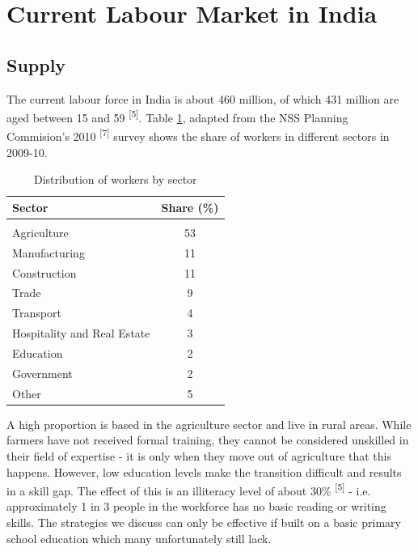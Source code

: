 \documentclass[a4paper, 10pt]{article}
\begin{document}
\section*{Current Labour Market in India}
\subsection*{Supply}

\noindent The current labour force in India is about 460 million, of which 431 million are aged between 15 and 59 \textsuperscript{[5]}. Table \ref{sector}, adapted from the NSS Planning Commision's 2010 \textsuperscript{[7]} survey shows the share of workers in different sectors in 2009-10. \\

\begin{table}[H]
\begin{center}
\begin{tabular}{l | c}

Sector & Share (\%) \\ \hline \\
Agriculture & 53 \\ 
Manufacturing & 11 \\
Construction & 11 \\
Trade & 9 \\
Transport & 4 \\
Hospitality and Real Estate & 3 \\
Education & 2 \\
Government & 2 \\
Other & 5 \\

\end{tabular}

\caption{Distribution of workers by sector}
\label{sector}
\end{center}
\end{table}

\noindent A high proportion is based in the agriculture sector and live in rural areas. While farmers have not received formal training, they cannot be considered unskilled in their field of expertise - it is only when they move out of agriculture that this happens. However, low education levels make the transition difficult and results in a skill gap. The effect of this is an illiteracy level of about 30\% \textsuperscript{[5]}  - i.e. approximately 1 in 3 people in the workforce has no basic reading or writing skills. The strategies we discuss can only be effective if built on a basic primary school education which many unfortunately still lack. 
\end{document}
